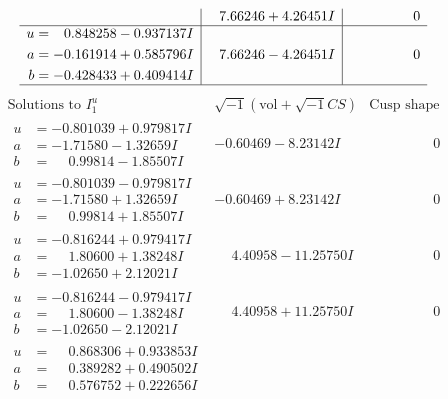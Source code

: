 \documentclass[1p]{elsarticle_modified}
\theoremstyle{definition}
\newcommand{\I}{\sqrt{-1}}
\begin{document}
$$\begin{array}{c|c|c}
 & \phantom{-}7.66246 + 4.26451 I & \phantom{-0.000000 } 0 \\ \hline\begin{aligned}
u &= \phantom{-}0.848258 - 0.937137 I \\
a &= -0.161914 + 0.585796 I \\
b &= -0.428433 + 0.409414 I\end{aligned}
 & \phantom{-}7.66246 - 4.26451 I & \phantom{-0.000000 } 0\\
 \hline 
 \end{array}$$\newpage$$\begin{array}{c|c|c}  
\text{Solutions to }I^u_{1}& \I (\text{vol} + \sqrt{-1}CS) & \text{Cusp shape}\\
 \hline 
\begin{aligned}
u &= -0.801039 + 0.979817 I \\
a &= -1.71580 - 1.32659 I \\
b &= \phantom{-}0.99814 - 1.85507 I\end{aligned}
 & -0.60469 - 8.23142 I & \phantom{-0.000000 } 0 \\ \hline\begin{aligned}
u &= -0.801039 - 0.979817 I \\
a &= -1.71580 + 1.32659 I \\
b &= \phantom{-}0.99814 + 1.85507 I\end{aligned}
 & -0.60469 + 8.23142 I & \phantom{-0.000000 } 0 \\ \hline\begin{aligned}
u &= -0.816244 + 0.979417 I \\
a &= \phantom{-}1.80600 + 1.38248 I \\
b &= -1.02650 + 2.12021 I\end{aligned}
 & \phantom{-}4.40958 - 11.25750 I & \phantom{-0.000000 } 0 \\ \hline\begin{aligned}
u &= -0.816244 - 0.979417 I \\
a &= \phantom{-}1.80600 - 1.38248 I \\
b &= -1.02650 - 2.12021 I\end{aligned}
 & \phantom{-}4.40958 + 11.25750 I & \phantom{-0.000000 } 0 \\ \hline\begin{aligned}
u &= \phantom{-}0.868306 + 0.933853 I \\
a &= \phantom{-}0.389282 + 0.490502 I \\
b &= \phantom{-}0.576752 + 0.222656 I\end{aligned}

\end{array}$$
\end{document}
